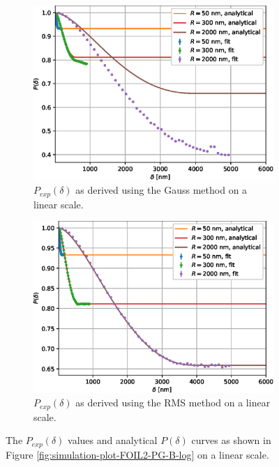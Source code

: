 \documentclass[]{article}
\begin{document}
	\begin{figure}[p]
		\centering
		\begin{subfigure}[b]{0.95\textwidth}
			\centering
			\includegraphics[width=\textwidth]{simulation-plot-gauss-FOIL2-PG-B-lin}
			\caption{$P_{exp}(\delta)$ as derived using the Gauss method on a linear scale.}
			\label{fig:simulation-plot-gauss-FOIL2-PG-B-lin}
		\end{subfigure}
		\hfill
		\centering
		\begin{subfigure}[b]{0.95\textwidth}
			\centering
			\includegraphics[width=\textwidth]{simulation-plot-rms-FOIL2-PG-B-lin}
			\caption{$P_{exp}(\delta)$ as derived using the RMS method on a linear scale.}
			\label{fig:simulation-plot-rms-FOIL2-PG-B-lin}
		\end{subfigure}
		\hfill
		\caption{The $P_{exp}(\delta)$ values and analytical $P(\delta)$ curves as shown in Figure \ref{fig:simulation-plot-FOIL2-PG-B-log} on a linear scale.}
		\label{fig:simulation-plot-FOIL2-PG-B-lin}
	\end{figure}
\end{document}
